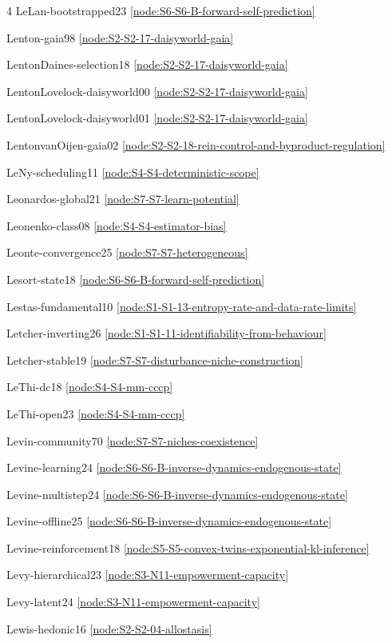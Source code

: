 \documentclass[10pt]{article}
\begin{document}
{\begin{multicols}{4}
LeLan-bootstrapped23 \hfill \ref{node:S6-S6-B-forward-self-prediction}\par
Lenton-gaia98 \hfill \ref{node:S2-S2-17-daisyworld-gaia}\par
LentonDaines-selection18 \hfill \ref{node:S2-S2-17-daisyworld-gaia}\par
LentonLovelock-daisyworld00 \hfill \ref{node:S2-S2-17-daisyworld-gaia}\par
LentonLovelock-daisyworld01 \hfill \ref{node:S2-S2-17-daisyworld-gaia}\par
LentonvanOijen-gaia02 \hfill \ref{node:S2-S2-18-rein-control-and-byproduct-regulation}\par
LeNy-scheduling11 \hfill \ref{node:S4-S4-deterministic-scope}\par
Leonardos-global21 \hfill \ref{node:S7-S7-learn-potential}\par
Leonenko-class08 \hfill \ref{node:S4-S4-estimator-bias}\par
Leonte-convergence25 \hfill \ref{node:S7-S7-heterogeneous}\par
Lesort-state18 \hfill \ref{node:S6-S6-B-forward-self-prediction}\par
Lestas-fundamental10 \hfill \ref{node:S1-S1-13-entropy-rate-and-data-rate-limits}\par
Letcher-inverting26 \hfill \ref{node:S1-S1-11-identifiability-from-behaviour}\par
Letcher-stable19 \hfill \ref{node:S7-S7-disturbance-niche-construction}\par
LeThi-dc18 \hfill \ref{node:S4-S4-mm-cccp}\par
LeThi-open23 \hfill \ref{node:S4-S4-mm-cccp}\par
Levin-community70 \hfill \ref{node:S7-S7-niches-coexistence}\par
Levine-learning24 \hfill \ref{node:S6-S6-B-inverse-dynamics-endogenous-state}\par
Levine-multistep24 \hfill \ref{node:S6-S6-B-inverse-dynamics-endogenous-state}\par
Levine-offline25 \hfill \ref{node:S6-S6-B-inverse-dynamics-endogenous-state}\par
Levine-reinforcement18 \hfill \ref{node:S5-S5-convex-twins-exponential-kl-inference}\par
Levy-hierarchical23 \hfill \ref{node:S3-N11-empowerment-capacity}\par
Levy-latent24 \hfill \ref{node:S3-N11-empowerment-capacity}\par
Lewis-hedonic16 \hfill \ref{node:S2-S2-04-allostasis}\par

\end{multicols}}
\end{document}
